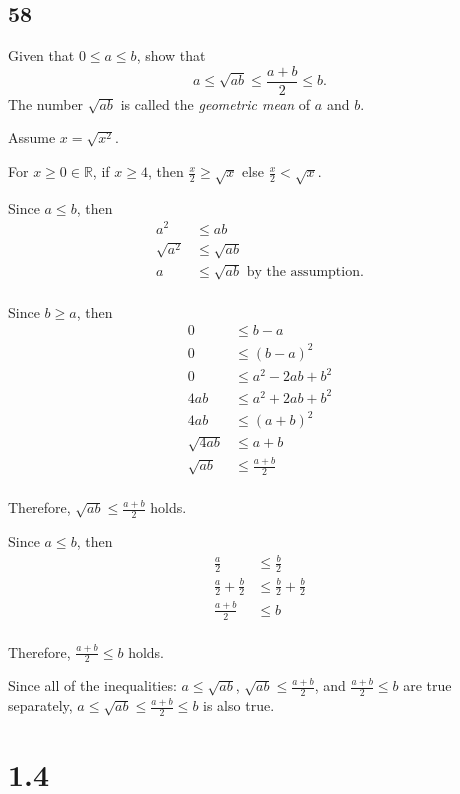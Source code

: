 \documentclass{article}
\begin{document}
\subsection*{58}
Given that $0 \leq a \leq b$, show that \[a \leq \sqrt{ab} \leq \frac{a+b}{2} \leq b.\] 
The number $\sqrt{ab}$ is called the \textit{geometric mean} of $a$ and $b$.

Assume $x = \sqrt{x^2}$.

For $x \geq 0 \in \mathbb{R}$, if $x \geq 4$, then $\frac{x}{2} \geq \sqrt{x}$ else $\frac{x}{2} < \sqrt{x}$.

Since $a \leq b$, then
\begin{align*}
    a^2 &\leq ab \\
    \sqrt{a^2} &\leq \sqrt{ab} \\
    a &\leq \sqrt{ab} \text{ by the assumption.} \\
\end{align*}

Since $b \geq a$, then
\begin{align*}
    0 &\leq b-a \\
    0 &\leq {(b-a)}^2 \\
    0 &\leq a^2 - 2ab + b^2 \\
    4ab &\leq a^2 + 2ab + b^2 \\
    4ab &\leq {(a+b)}^2 \\
    \sqrt{4ab} &\leq a+b \\
    \sqrt{ab} &\leq \frac{a+b}{2} \\
\end{align*} 

Therefore, $\sqrt{ab} \leq \frac{a+b}{2}$ holds.


Since $a \leq b$, then
\begin{align*}
    \frac{a}{2} &\leq \frac{b}{2} \\
    \frac{a}{2} + \frac{b}{2} &\leq \frac{b}{2} + \frac{b}{2} \\
    \frac{a + b}{2} &\leq b \\
\end{align*}

Therefore, $\frac{a + b}{2} \leq b$ holds.

Since all of the inequalities: $a \leq \sqrt{ab}$, $\sqrt{ab} \leq \frac{a+b}{2}$, and $\frac{a+b}{2} \leq b$ are true separately,
$a \leq \sqrt{ab} \leq \frac{a+b}{2} \leq b$ is also true.


\section*{1.4}
\end{document}
